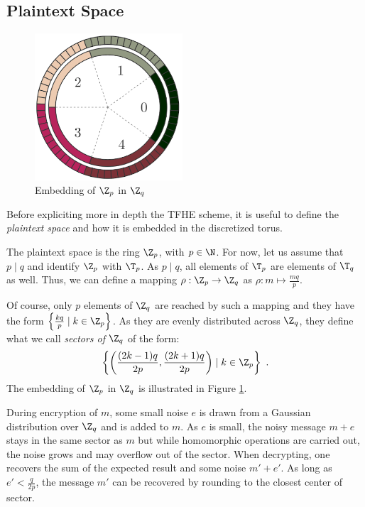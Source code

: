 \subsection{Plaintext Space}
\label{sec:plaintext_space}

\begin{figure}
    \centering
    \caption{Embedding of $\Z_p$ in $\Z_q$ \label{fig:embedding}}
    \includegraphics[width=5.5cm]{images/embedding.png}
\end{figure} 

Before expliciting more in depth the TFHE scheme, it is useful to define the \emph{plaintext space} and how it is embedded in the discretized torus. 

The plaintext space is the ring $\Z_p$, with $p \in \N$. For now, let us assume that $p \mid q$ and identify $\Z_p$ with $\T_p$. As $p \mid q$, all elements of $\T_p$ are elements of $\T_q$ as well. Thus, we can define a mapping $\rho: \Z_p \to \Z_q$ as $\rho: m  \mapsto \frac{m q} {p}$. 


Of course, only $p$ elements of $\Z_q$ are reached by such a mapping and they have the form $\left \{ \frac {k q}{p} \mid k \in \Z_p \right \}$. As they are evenly distributed across $\Z_q$, they define what we call \emph{sectors of $\Z_q$} of the form: 
\[\left \{ \left ( \frac{(2 k - 1)q}{2p}, \frac{(2k + 1)q}{2p} \right ) \mid k \in \Z_p \right \} ~.\] The embedding of $\Z_p$ in $\Z_q$ is illustrated in Figure \ref{fig:embedding}.

During encryption of $m$, some small noise $e$ is drawn from a Gaussian distribution over $\Z_q$ and is added to $m$. As $e$ is small, the noisy message $m + e$ stays in the same sector as $m$ but while homomorphic operations are carried out, the noise grows and may overflow out of the sector. When decrypting, one recovers the sum of the expected result and some noise $m' + e'$. As long as $e' < \frac{q}{2p}$, the message $m'$ can be recovered by rounding to the closest center of sector.




